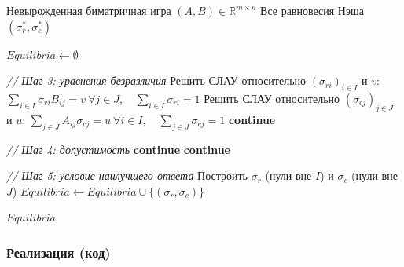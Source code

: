 \begin{algorithm}[H]
\caption{Support Enumeration --- поиск всех равновесий Нэша}
\begin{algorithmic}[1]
\Require Невырожденная биматричная игра $(A,B)\in\mathbb{R}^{m\times n}$
\Ensure Все равновесия Нэша $(\sigma_r^*, \sigma_c^*)$

\State $\textit{Equilibria} \gets \emptyset$


      \Statex\hspace{2.8em}\textit{// Шаг 3: уравнения безразличия}
      \State Решить СЛАУ относительно $(\sigma_{ri})_{i\in I}$ и $v$:
        \hspace{0.5em}
        $\displaystyle\sum_{i\in I}\sigma_{ri}B_{ij}=v\ \forall j{\in}J,
        \quad\sum_{i\in I}\sigma_{ri}=1$
      \State Решить СЛАУ относительно $(\sigma_{cj})_{j\in J}$ и $u$:
        \hspace{0.5em}
        $\displaystyle\sum_{j\in J}A_{ij}\sigma_{cj}=u\ \forall i{\in}I,
        \quad\sum_{j\in J}\sigma_{cj}=1$
       \textbf{continue} \EndIf

      \Statex\hspace{2.8em}\textit{// Шаг 4: допустимость}
        \textbf{continue} \EndIf
        \textbf{continue} \EndIf

      \Statex\hspace{2.8em}\textit{// Шаг 5: условие наилучшего ответа}
      \State Построить $\sigma_r$ (нули вне $I$) и $\sigma_c$ (нули вне $J$)
        \State $\textit{Equilibria}\gets
               \textit{Equilibria}\cup\{(\sigma_r,\sigma_c)\}$
      \EndIf

    \EndFor
  \EndFor
\EndFor
\State \Return $\textit{Equilibria}$
\end{algorithmic}
\end{algorithm}

\subsubsection{Реализация (код)}


